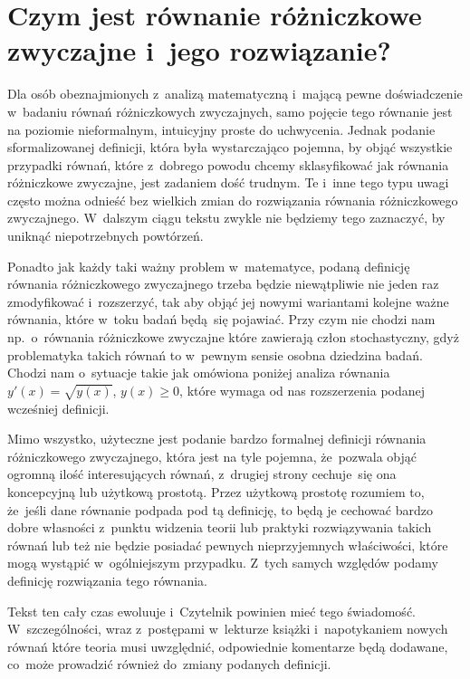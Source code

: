 \documentclass[a4paper,11pt]{article}
\numberwithin{equation}{section}
\begin{document}
\section{Czym jest równanie różniczkowe zwyczajne i~jego
  rozwiązanie?}

\label{sec:Czym-jest-rownanie-ETC}



Dla osób obeznajmionych z~analizą matematyczną i~mającą pewne doświadczenie
w~badaniu równań różniczkowych zwyczajnych, samo pojęcie tego równanie jest
na poziomie nieformalnym, intuicyjny proste do uchwycenia.
Jednak podanie sformalizowanej definicji, która była wystarczająco pojemna,
by objąć wszystkie przypadki równań, które z~dobrego powodu chcemy
sklasyfikować jak równania różniczkowe zwyczajne, jest zadaniem dość
trudnym. Te i~inne tego typu uwagi często można odnieść bez wielkich zmian
do
rozwiązania równania różniczkowego zwyczajnego. W~dalszym ciągu tekstu
zwykle
nie będziemy tego zaznaczyć, by uniknąć niepotrzebnych powtórzeń.

Ponadto jak każdy taki ważny problem w~matematyce, podaną definicję
równania różniczkowego zwyczajnego trzeba będzie niewątpliwie nie jeden raz
zmodyfikować i~rozszerzyć, tak aby objąć jej nowymi wariantami kolejne ważne
równania, które w~toku badań będą~się
pojawiać. Przy czym nie chodzi nam np.~o~równania różniczkowe zwyczajne
które
zawierają człon stochastyczny, gdyż problematyka takich równań to w~pewnym
sensie osobna dziedzina badań. Chodzi nam o~sytuacje takie jak omówiona
poniżej analiza równania $y'( x ) = \sqrt{ y( x ) }$, $y( x ) \geq 0$, które
wymaga od nas rozszerzenia podanej wcześniej definicji.

Mimo wszystko, użyteczne jest podanie bardzo formalnej definicji równania
różniczkowego zwyczajnego, która jest na tyle pojemna, że~pozwala objąć
ogromną ilość interesujących równań, z~drugiej strony cechuje~się ona
koncepcyjną lub użytkową prostotą. Przez użytkową prostotę rozumiem to,
że~jeśli dane równanie podpada pod tą definicję, to będą je
cechować bardzo dobre własności z~punktu widzenia teorii lub praktyki
rozwiązywania takich równań lub też nie będzie posiadać pewnych
nieprzyjemnych właściwości, które mogą wystąpić w~ogólniejszym przypadku.
Z~tych samych względów podamy definicję rozwiązania tego równania.

Tekst ten cały czas ewoluuje i~Czytelnik powinien mieć tego świadomość.
W~szczególności, wraz z~postępami w~lekturze książki i~napotykaniem nowych
równań które teoria musi uwzględnić, odpowiednie komentarze będą dodawane,
co~może prowadzić również do~zmiany podanych definicji.
\end{document}
